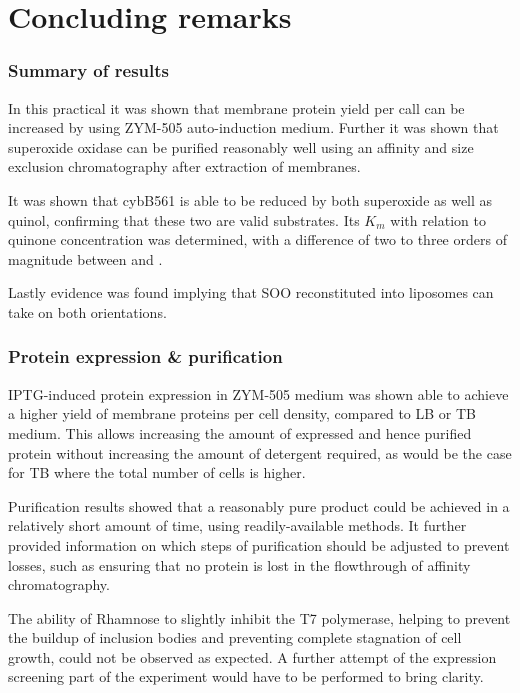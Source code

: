 \part{Concluding remarks}

\section{Summary of results}

In this practical it was shown that membrane protein yield per call can be increased
by using ZYM-505 auto-induction medium. Further it was shown that superoxide
oxidase can be purified reasonably well using an affinity and size exclusion
chromatography after extraction of membranes.

It was shown that cybB561 is able to be reduced by both superoxide as well as
quinol, confirming that these two are valid substrates. Its $K_m$ with relation
to quinone concentration was determined, with a difference of two to three
orders of magnitude between \hs{} and \hsmut{}.

Lastly evidence was found implying that SOO reconstituted into liposomes can
take on both orientations.

\section{Protein expression \& purification}

IPTG-induced protein expression in ZYM-505 medium was shown able to achieve a
higher yield of membrane proteins per cell density, compared to LB or TB
medium. This allows increasing the amount of expressed and hence purified
protein without increasing the amount of detergent required, as would be the
case for TB where the total number of cells is higher.\cite{memstar}

Purification results showed that a reasonably pure product could be achieved in
a relatively short amount of time, using readily-available methods. It further
provided information on which steps of purification should be adjusted to
prevent losses, such as ensuring that no protein is lost in the flowthrough of
affinity chromatography.

The ability of Rhamnose to slightly inhibit the T7 polymerase, helping to
prevent the buildup of inclusion bodies and preventing complete stagnation of
cell growth, could not be observed as expected. A further attempt of the
expression screening part of the experiment would have to be performed to bring
clarity.

